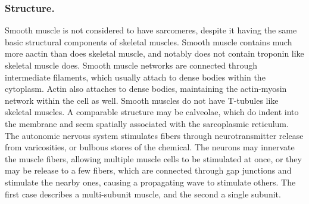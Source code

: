 \subsubsection{Structure.}
Smooth muscle is not considered to have sarcomeres, despite it having the same basic structural components of skeletal muscles. Smooth muscle contains much more aactin than does skeletal muscle, and notably does not contain troponin like skeletal muscle does. Smooth muscle networks are connected through intermediate filaments, which usually attach to dense bodies within the cytoplasm. Actin also attaches to dense bodies, maintaining the actin-myosin network within the cell as well. Smooth muscles do not have T-tubules like skeletal muscles. A comparable structure may be calveolae, which do indent into the membrane and seem spatially associated with the sarcoplasmic reticulum. The autonomic nervous system stimulates fibers through neurotransmitter release from varicosities, or bulbous stores of the chemical. The neurons may innervate the muscle fibers, allowing multiple muscle cells to be stimulated at once, or they may be release to a few fibers, which are connected through gap junctions and stimulate the nearby ones, causing a propagating wave to stimulate others. The first case describes a multi-subunit muscle, and the second a single subunit. 

